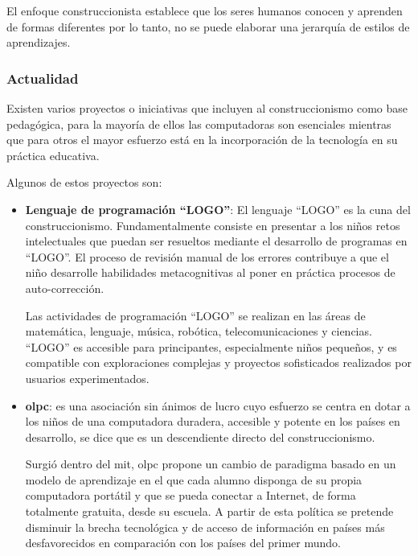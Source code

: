 El enfoque construccionista establece que los seres humanos conocen y aprenden
de formas diferentes por lo tanto, no se puede elaborar una jerarquía de estilos
de aprendizajes\cite{valdivia:sg}.

\subsubsection{Actualidad}

Existen varios proyectos o iniciativas que incluyen al construccionismo como
base pedagógica, para la mayoría de ellos las computadoras son esenciales
mientras que para otros el mayor esfuerzo está en la incorporación de la
tecnología en su práctica educativa\cite{papertian:const}.

Algunos de estos proyectos son:

\begin{itemize}

\item \textbf{Lenguaje de programación \enquote{LOGO}}: El lenguaje
    \enquote{LOGO} es la cuna del construccionismo. Fundamentalmente consiste en
    presentar a los niños retos intelectuales que puedan ser resueltos mediante
    el desarrollo de programas en \enquote{LOGO}. El proceso de revisión manual de los
    errores contribuye a que el niño desarrolle habilidades metacognitivas al
    poner en práctica procesos de auto-corrección\cite{logo:sg}.

    Las actividades de programación \enquote{LOGO} se realizan en las áreas de
    matemática, lenguaje, música, robótica, telecomunicaciones y ciencias.
    \enquote{LOGO} es accesible para principantes, especialmente niños pequeños,
    y es compatible con exploraciones complejas y proyectos sofisticados
    realizados por usuarios experimentados\cite{logo:sg}.
    
\item \textbf{\Gls{olpc}}: es una asociación sin ánimos de lucro cuyo esfuerzo
    se centra en dotar a los niños de una computadora duradera, accesible y
    potente en los países en desarrollo, se dice que es un descendiente directo
    del construccionismo\cite{papertian:const}.
	
    Surgió dentro del \gls{mit}, \Gls{olpc} propone un cambio de paradigma
    basado en un modelo de aprendizaje en el que cada alumno disponga de su
    propia computadora portátil y que se pueda conectar a Internet, de forma
    totalmente gratuita, desde su escuela. A partir de esta política se pretende
    disminuir la brecha tecnológica y de acceso de información en países más
    desfavorecidos en comparación con los países del primer
    mundo\cite{videojuegos:gonzaleztardon}.
	

\end{itemize}
